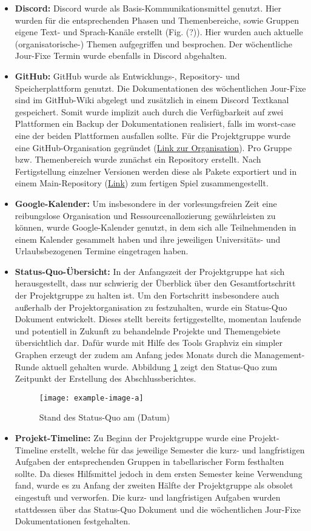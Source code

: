 \begin{itemize}
	\item \textbf{Discord: } Discord wurde als Basis-Kommunikationsmittel genutzt. Hier wurden für die entsprechenden Phasen und Themenbereiche, sowie Gruppen eigene Text- und Sprach-Kanäle erstellt (Fig. (?)). Hier wurden auch aktuelle (organisatorische-) Themen aufgegriffen und besprochen. Der wöchentliche Jour-Fixe Termin wurde ebenfalls in Discord abgehalten.
	\item \textbf{GitHub: } GitHub wurde als Entwicklungs-, Repository- und Speicherplattform genutzt. Die Dokumentationen des wöchentlichen Jour-Fixe sind im GitHub-Wiki abgelegt und zusätzlich in einem Discord Textkanal gespeichert. Somit wurde implizit auch durch die Verfügbarkeit auf zwei Plattformen ein Backup der Dokumentationen realisiert, falls im worst-case eine der beiden Plattformen ausfallen sollte. Für die Projektgruppe wurde eine GitHub-Organisation gegründet (\href{https://github.com/PG649-3D-RPG}{Link zur Organisation}). Pro Gruppe bzw. Themenbereich wurde zunächst ein Repository erstellt. Nach Fertigstellung einzelner Versionen werden diese als Pakete exportiert und in einem Main-Repository (\href{}{Link}) zum fertigen Spiel zusammengestellt.
	\item \textbf{Google-Kalender: } Um insbesondere in der vorlesungsfreien Zeit eine reibungslose Organisation und Ressourcenallozierung gewährleisten zu können, wurde Google-Kalender genutzt, in dem sich alle Teilnehmenden in einem Kalender gesammelt haben und ihre jeweiligen Universitäts- und Urlaubsbezogenen Termine eingetragen haben.
	\item \textbf{Status-Quo-Übersicht: } In der Anfangszeit der Projektgruppe hat sich herausgestellt, dass nur schwierig der Überblick über den Gesamtfortschritt der Projektgruppe zu halten ist. Um den Fortschritt insbesondere auch außerhalb der Projektorganisation zu festzuhalten, wurde ein Status-Quo Dokument entwickelt. Dieses stellt bereits fertiggestellte, momentan laufende und potentiell in Zukunft zu behandelnde Projekte und Themengebiete übersichtlich dar. Dafür wurde mit Hilfe des Tools Graphviz ein simpler Graphen erzeugt der zudem am Anfang jedes Monats durch die Management-Runde aktuell gehalten wurde. Abbildung \ref{fig:status-quo} zeigt den Status-Quo zum Zeitpunkt der Erstellung des Abschlussberichtes.
	\begin{figure}
		\centering
		\texttt{[image: example-image-a]}
		\caption{Stand des Status-Quo am (Datum)}
		\label{fig:status-quo}
	\end{figure}
	\item \textbf{Projekt-Timeline: } Zu Beginn der Projektgruppe wurde eine Projekt-Timeline erstellt, welche für das jeweilige Semester die kurz- und langfristigen Aufgaben der entsprechenden Gruppen in tabellarischer Form festhalten sollte. Da dieses Hilfsmittel jedoch in dem ersten Semester keine Verwendung fand, wurde es zu Anfang der zweiten Hälfte der Projektgruppe als obsolet eingestuft und verworfen. Die kurz- und langfristigen Aufgaben wurden stattdessen über das Status-Quo Dokument und die wöchentlichen Jour-Fixe Dokumentationen festgehalten.
\end{itemize}




